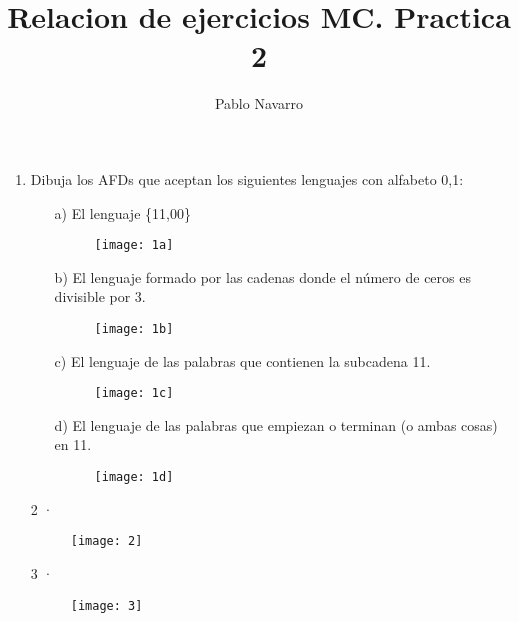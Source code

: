 \documentclass{article}
\begin{document}
\title{Relacion de ejercicios MC. Practica 2}
\author{Pablo Navarro}
\maketitle
\begin{enumerate}
  \item  Dibuja los AFDs que aceptan los siguientes lenguajes con alfabeto {0,1}:
  \begin{itemize}
    \item [a)] El lenguaje \{11,00\}
          \begin{figure}[H]
            \centering
            \texttt{[image: 1a]}
          \end{figure}
    \item [b)] El lenguaje formado por las cadenas donde el número de ceros es
divisible por 3.
          \begin{figure}[H]
            \centering
            \texttt{[image: 1b]}
          \end{figure}
    \item [c)] El lenguaje de las palabras que contienen la subcadena 11.
          \begin{figure}[H]
            \centering
            \texttt{[image: 1c]}
          \end{figure}
    \item [d)] El lenguaje de las palabras que empiezan o terminan (o ambas cosas) en
11.
          \begin{figure}[H]
            \centering
            \texttt{[image: 1d]}
          \end{figure}
  \end{itemize}
  \item [2]·
        \begin{figure}[H]
          \centering
          \texttt{[image: 2]}
        \end{figure}
  \item [3]·
        \begin{figure}[H]
          \centering
          \texttt{[image: 3]}
        \end{figure}
\end{enumerate}
\end{document}
